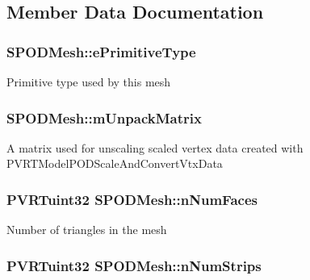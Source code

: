 \subsection{Member Data Documentation}
\hypertarget{struct_s_p_o_d_mesh_a4c3421666ba901e6c560906b7f2b16c6}{
\subsubsection[{e\+Primitive\+Type}]{ S\+P\+O\+D\+Mesh\+::e\+Primitive\+Type}}\label{struct_s_p_o_d_mesh_a4c3421666ba901e6c560906b7f2b16c6}
Primitive type used by this mesh \hypertarget{struct_s_p_o_d_mesh_aec4e642cca903963adccca5198861f00}{
\subsubsection[{m\+Unpack\+Matrix}]{ S\+P\+O\+D\+Mesh\+::m\+Unpack\+Matrix}}\label{struct_s_p_o_d_mesh_aec4e642cca903963adccca5198861f00}
A matrix used for unscaling scaled vertex data created with P\+V\+R\+T\+Model\+P\+O\+D\+Scale\+And\+Convert\+Vtx\+Data \hypertarget{struct_s_p_o_d_mesh_aeb1fee79d92adcbc739312d44ea7caa6}{
\subsubsection[{n\+Num\+Faces}]{\setlength{\rightskip}{0pt plus 5cm}P\+V\+R\+Tuint32 S\+P\+O\+D\+Mesh\+::n\+Num\+Faces}}\label{struct_s_p_o_d_mesh_aeb1fee79d92adcbc739312d44ea7caa6}
Number of triangles in the mesh \hypertarget{struct_s_p_o_d_mesh_ac49f09d495e3a1b0152ed4eb6f15b443}{
\subsubsection[{n\+Num\+Strips}]{\setlength{\rightskip}{0pt plus 5cm}P\+V\+R\+Tuint32 S\+P\+O\+D\+Mesh\+::n\+Num\+Strips}}\label{struct_s_p_o_d_mesh_ac49f09d495e3a1b0152ed4eb6f15b443}
